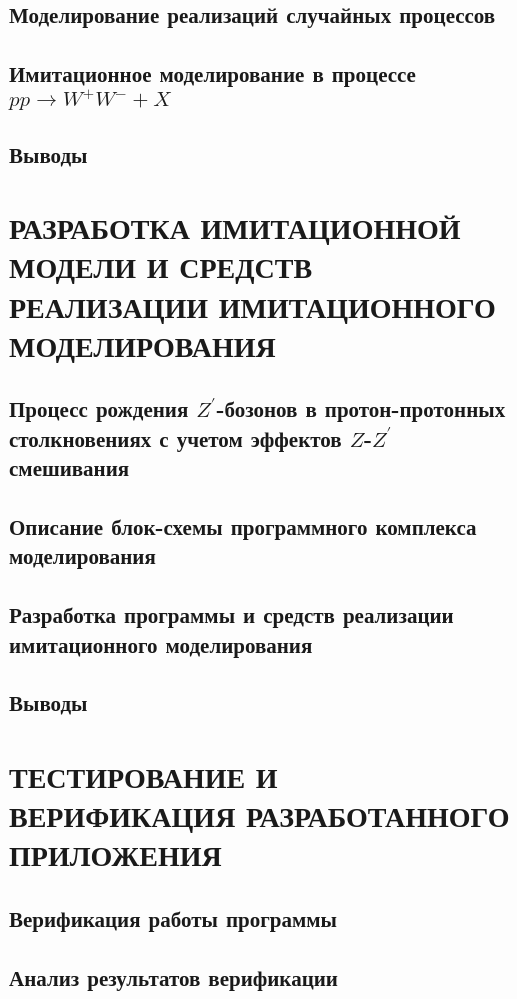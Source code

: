 \documentclass[12pt,a4paper]{styles/report}
\begin{document}
\section{Моделирование реализаций случайных процессов}

\section{Имитационное моделирование в процессе $pp \rightarrow W^+W^- + X$}

\section{Выводы}



\chapter{РАЗРАБОТКА ИМИТАЦИОННОЙ МОДЕЛИ И СРЕДСТВ РЕАЛИЗАЦИИ ИМИТАЦИОННОГО МОДЕЛИРОВАНИЯ}
\section{Процесс рождения $Z^\prime$-бозонов в протон-протонных столкновениях с учетом эффектов $Z$-$Z^\prime$ смешивания}


\section{Описание блок-схемы программного комплекса
	моделирования}

\section{Разработка программы и средств реализации имитационного моделирования}

\section{Выводы}


\chapter{ТЕСТИРОВАНИЕ И ВЕРИФИКАЦИЯ РАЗРАБОТАННОГО ПРИЛОЖЕНИЯ}
\section{Верификация работы программы}

\section{Анализ результатов верификации}

\end{document}
